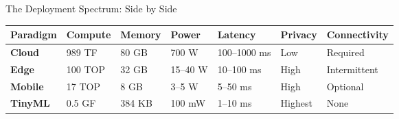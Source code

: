 \documentclass[aspectratio=169, 12pt]{beamer}
\begin{document}
\begin{frame}{The Deployment Spectrum: Side by Side}
\note{
%
%
%
%
}

\scriptsize
\renewcommand{\arraystretch}{1.0}
\begin{tabular}{@{}lllllll@{}}
  \toprule
  \textbf{Paradigm} & \textbf{Compute} & \textbf{Memory} & \textbf{Power} & \textbf{Latency} & \textbf{Privacy} & \textbf{Connectivity} \\
  \midrule
  \textbf{Cloud}  & 989 TF  & 80 GB  & 700 W    & 100--1000 ms & Low     & Required \\
  \textbf{Edge}   & 100 TOP & 32 GB  & 15--40 W & 10--100 ms   & High    & Intermittent \\
  \textbf{Mobile} & 17 TOP  & 8 GB   & 3--5 W   & 5--50 ms     & High    & Optional \\
  \textbf{TinyML} & 0.5 GF  & 384 KB & 100 mW   & 1--10 ms     & Highest & None \\
  \bottomrule
\end{tabular}


\end{frame}
\end{document}
